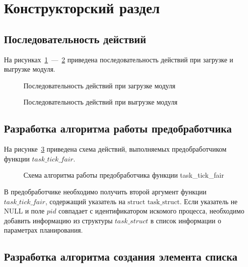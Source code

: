 \section{Конструкторский раздел}

\subsection{Последовательность действий}

На рисунках~\ref{fig:init}~---~\ref{fig:exit} приведена последовательность действий при загрузке и выгрузке модуля.

\begin{figure}[H]
	\centering
	
	\caption{Последовательность действий при загрузке модуля}
	\label{fig:init}
\end{figure}

\begin{figure}[H]
	\centering
	
	\caption{Последовательность действий при выгрузке модуля}
	\label{fig:exit}
\end{figure}

\subsection{Разработка алгоритма работы предобработчика}

На рисунке~\ref{fig:pre_hook} приведена схема действий, выполняемых предобработчиком функции $task\_tick\_fair$.

\begin{figure}[H]
	\centering
	
	\caption{Схема алгоритма работы предобработчика функции task\_tick\_fair}
	\label{fig:pre_hook}
\end{figure}

В предобработчике необходимо получить второй аргумент функции \\ $task\_tick\_fair$, содержащий указатель на $\text{struct task\_struct}$.
Если указатель не NULL и поле $pid$ совпадает с идентификатором искомого процесса, необходимо добавить информацию из структуры $task\_struct$ в список информации о параметрах планирования.

\subsection{Разработка алгоритма создания элемента списка}

